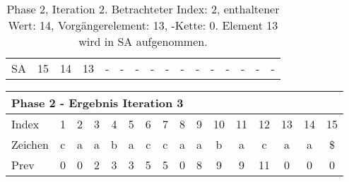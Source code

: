\begin{table}[H]
\begin{adjustbox}{max width=\textwidth}
\begin{tabular}{lccccccccccccccc}
\multicolumn{1}{l|}{SA}      & \multicolumn{1}{c|}{15} & \cellcolor[HTML]{\green}14 & \multicolumn{1}{c|}{\cellcolor[HTML]{\red}13} & \multicolumn{1}{c|}{-}     & \multicolumn{1}{c|}{-}      & \multicolumn{1}{c|}{-}    & \multicolumn{1}{c|}{-}     & \multicolumn{1}{c|}{-}  & \multicolumn{1}{c|}{-}   & -  & \multicolumn{1}{c|}{-}  & -   & -   & -   & -  
\end{tabular}
\end{adjustbox}

\caption[Phase 2, Iteration 2]{Phase 2, Iteration 2. Betrachteter Index: 2, enthaltener Wert: 14, Vorgängerelement: 13, \prevpointer-Kette: 0. Element 13 wird in SA aufgenommen.}
\label{table_complex_example_2_2} 
\end{table}

\begin{table}[H]
\centering
\begin{adjustbox}{max width=\textwidth}
\centering
\begin{tabular}{lccccccccccccccc}
\multicolumn{16}{l}{Phase 2 - Ergebnis Iteration 3}                                                                                                                                                                                                                                                                                                                                                                                \\ \hline
\multicolumn{1}{l|}{Index}   & 1                       & 2  & 3                                               & 4                                              & 5                           & 6                                              & 7                          & 8                                               & 9                        & 10 & 11                      & 12                         & 13 & 14 & 15 \\
\multicolumn{1}{l|}{Zeichen} & c                       & a  & a                                               & b                                              & a                           & c                                              & c                          & a                                               & a                        & b  & a                       & c                          & a  & a  & \$ \\
\multicolumn{1}{l|}{Prev}    & 0                       & 0  & 2                                               & 3                                              & 3                           & 5                                              & 5                          & 0                                               & 8                        & 9  & 9                       & 11                         & 0  & 0  & 0  \\ \hline

\end{tabular}
\end{adjustbox}
\end{table}
